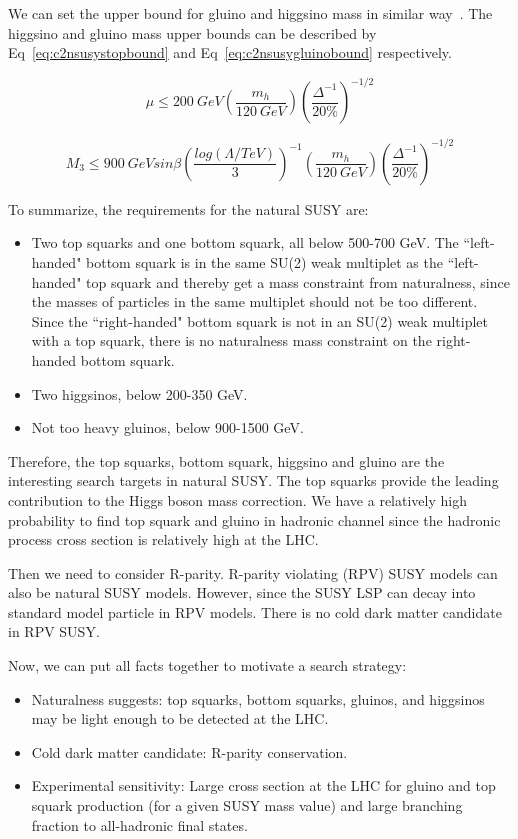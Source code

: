 We can set the upper bound for gluino and higgsino mass in similar way~\cite{Papucci:2011wy}. The higgsino and gluino mass upper bounds can be described by Eq~\ref{eq:c2nsusystopbound} and Eq~\ref{eq:c2nsusygluinobound} respectively.

\begin{equation}
 \mu \leq 200~GeV (\frac{m_{h}}{120~GeV})(\frac{\Delta^{-1}}{20\%})^{-1/2}
 \label{eq:c2nsusyhiggsinobound}
\end{equation}

\begin{equation}
 M_{3} \leq 900~GeV sin\beta (\frac{log(\Lambda/TeV)}{3})^{-1}(\frac{m_{h}}{120~GeV})(\frac{\Delta^{-1}}{20\%})^{-1/2}
 \label{eq:c2nsusygluinobound}
\end{equation}

To summarize, the requirements for the natural SUSY are:
\begin{itemize}
\item Two top squarks and one bottom squark, all below 500-700 GeV. 
The ``left-handed" bottom squark is in the same SU(2)
weak multiplet as the ``left-handed" top squark and
thereby get a mass constraint from naturalness,
since the masses of particles in the same multiplet
should not be too different. Since the ``right-handed"
bottom squark is not in an SU(2) weak multiplet with a
top squark, there is no naturalness mass constraint on
the right-handed bottom squark.
\item Two higgsinos, below 200-350 GeV.
\item Not too heavy gluinos, below 900-1500 GeV.
\end{itemize}

Therefore, the top squarks, bottom squark, higgsino and gluino are the interesting search targets in natural SUSY. The top squarks provide the leading contribution to the Higgs boson mass correction. We have a relatively high probability to find top squark and gluino in hadronic channel since the hadronic process cross section is relatively high at the LHC. 

Then we need to consider R-parity. R-parity violating (RPV) SUSY models can also be natural SUSY models. However, since the SUSY LSP can decay into standard model particle in RPV models. There is no cold dark matter candidate in RPV SUSY. 

Now, we can put all facts together to motivate a search strategy: 
\begin{itemize}
\item Naturalness suggests: top squarks, bottom squarks, gluinos, and higgsinos may be light enough to be detected at the LHC.
\item Cold dark matter candidate: R-parity conservation.
\item Experimental sensitivity: Large cross section at the LHC for gluino and top squark production (for a given SUSY mass value) and large branching fraction to all-hadronic final states.
\end{itemize}

